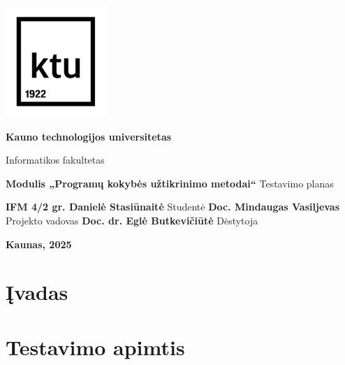 \documentclass[12pt]{article}
\begin{document}

\begin{titlepage}
\vskip 20pt
\begin{center}
\includegraphics[scale=1.4]{KTU.png}
\end{center}


\vskip 20pt
\centerline{\bf \large \textbf{Kauno technologijos universitetas}}
\bigskip
\centerline{\large {Informatikos fakultetas}}
\bigskip

\vskip 90pt
\begin{center}
    {\bf \LARGE Modulis „Programų kokybės užtikrinimo metodai“}
    \vskip 15pt
    {\large Testavimo planas}
\end{center}

\vskip 40pt

\hskip 200pt {\bf \large IFM 4/2 gr. Danielė Stasiūnaitė}
\vskip 1pt
\hskip 200pt {\large Studentė}
\vskip 7pt
\hskip 200pt {\bf \large Doc. Mindaugas Vasiljevas}
\vskip 1pt
\hskip 200pt {\large Projekto vadovas}
\vskip 7pt
\hskip 200pt {\bf \large Doc. dr. Eglė Butkevičiūtė}
\vskip 1pt
\hskip 200pt {\large Dėstytoja}

\bigskip

\vskip 100pt
\centerline{\large \textbf{Kaunas, 2025}}
\newpage
\end{titlepage}



\tableofcontents
\newpage


\section{Įvadas}

\section{Testavimo apimtis}
\end{document}
